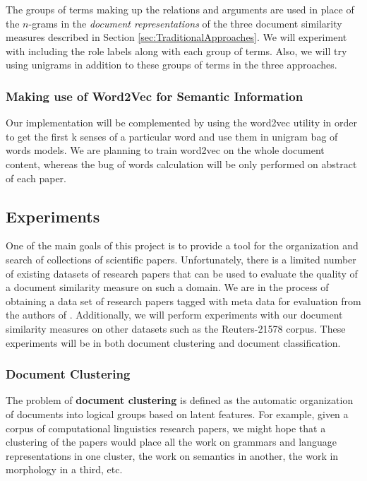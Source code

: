\documentclass[11pt]{article}
\newcommand{\bt}[1]{\textbf{#1}}
\begin{document}
The groups of terms making up the relations and arguments are used in place of the $n$-grams in the \emph{document representations} of the three document similarity measures described in Section \ref{sec:TraditionalApproaches}. We will experiment with including the role labels along with each group of terms. Also, we will try using unigrams in addition to these groups of terms in the three approaches. 


\subsubsection{Making use of Word2Vec for Semantic Information} \label{sec:Word2Vec}


Our implementation will be complemented by using the word2vec utility in order to get the first k senses of a particular word and use them in unigram bag of words models. We are planning to train word2vec on the whole document content, whereas the bug of words calculation will be only performed on abstract of each paper. 


\subsection{Experiments}

One of the main goals of this project is to provide a tool for the organization and search of collections of scientific papers. Unfortunately, there is a limited number of existing datasets of research papers that can be used to evaluate the quality of a document similarity measure on such a domain. We are in the process of obtaining a data set of research papers tagged with meta data for evaluation from the authors of \cite{Hurtado2013}. Additionally, we will perform experiments with our document similarity measures on other datasets such as the Reuters-21578 corpus. These experiments will be in both document clustering and document classification. 

\subsubsection{Document Clustering} \label{sec:DocumentClusterting}

The problem of \bt{document clustering} is defined as the automatic organization of documents into logical groups based on latent features. For example, given a corpus of computational linguistics research papers, we might hope that a clustering of the papers would place all the work on grammars and language representations in one cluster, the work on semantics in another, the work in morphology in a third, etc. 
\end{document}
